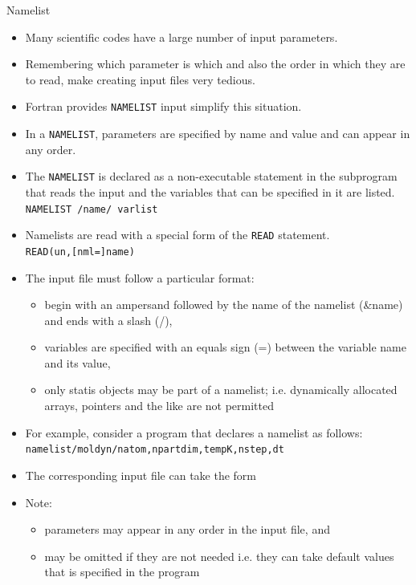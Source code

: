 \documentclass[c,mathserif,compress,xcolor=svgnames]{beamer}
\newcommand{\lstfortran}[1]{\lstinline[language={[90]Fortran},basicstyle=\footnotesize\ttfamily]|#1|}
\begin{document}
\begin{frame}{Namelist}
  \begin{itemize}
    \item Many scientific codes have a large number of input parameters.
    \item Remembering which parameter is which and also the order in which they are to read, make creating input files very tedious.
    \item Fortran provides \lstfortran{NAMELIST} input simplify this situation.
    \item In a \lstfortran{NAMELIST}, parameters are specified by name and value and can appear in any order.
    \item The \lstfortran{NAMELIST} is declared as a non-executable statement in the subprogram that reads the input and the variables that can be specified in it are listed.\\
      \lstfortran{NAMELIST /name/ varlist}
    \item Namelists are read with a special form of the \lstfortran{READ} statement.\\
      \lstfortran{READ(un,[nml=]name)}
      \framebreak
    \item The input file must follow a particular format:
      \begin{itemize}
        \item begin with an ampersand followed by the name of the namelist (\&name) and ends with a slash (/),
        \item variables are specified with an equals sign (=) between the variable name and its value,
        \item only statis objects may be part of a namelist; i.e. dynamically allocated arrays, pointers and the like are not permitted
      \end{itemize}
    \item For example, consider a program that declares a namelist as follows:\\
      \lstfortran{namelist/moldyn/natom,npartdim,tempK,nstep,dt}
    \item The corresponding input file can take the form
      
    \item Note:
      \begin{itemize}
        \item parameters may appear in any order in the input file, and
        \item may be omitted if they are not needed i.e. they can take default values that is specified in the program

\end{itemize}
\end{itemize}
\end{frame}
\end{document}
